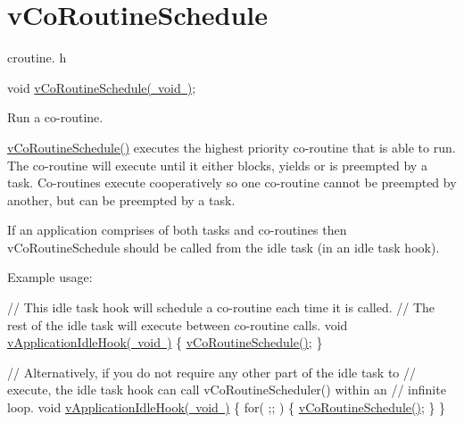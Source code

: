 \hypertarget{group__v_co_routine_schedule}{}\section{v\+Co\+Routine\+Schedule}
\label{group__v_co_routine_schedule}
croutine. h 
\begin{DoxyPre}
void \mbox{\hyperlink{croutine_8h_a5333c649a2c063006ca3cd7a3b5b9240}{vCoRoutineSchedule( void )}};\end{DoxyPre}


Run a co-\/routine.

\mbox{\hyperlink{croutine_8h_a5333c649a2c063006ca3cd7a3b5b9240}{v\+Co\+Routine\+Schedule()}} executes the highest priority co-\/routine that is able to run. The co-\/routine will execute until it either blocks, yields or is preempted by a task. Co-\/routines execute cooperatively so one co-\/routine cannot be preempted by another, but can be preempted by a task.

If an application comprises of both tasks and co-\/routines then v\+Co\+Routine\+Schedule should be called from the idle task (in an idle task hook).

Example usage\+: 
\begin{DoxyPre}
// This idle task hook will schedule a co-routine each time it is called.
// The rest of the idle task will execute between co-routine calls.
void \mbox{\hyperlink{_free_r_t_o_s_common_hooks_8h_a97fd430f36f8b065226e2bff9bad1de5}{vApplicationIdleHook( void )}}
\{
   \mbox{\hyperlink{croutine_8h_a5333c649a2c063006ca3cd7a3b5b9240}{vCoRoutineSchedule()}};
\}\end{DoxyPre}



\begin{DoxyPre}// Alternatively, if you do not require any other part of the idle task to
// execute, the idle task hook can call vCoRoutineScheduler() within an
// infinite loop.
void \mbox{\hyperlink{_free_r_t_o_s_common_hooks_8h_a97fd430f36f8b065226e2bff9bad1de5}{vApplicationIdleHook( void )}}
\{
   for( ;; )
   \{
       \mbox{\hyperlink{croutine_8h_a5333c649a2c063006ca3cd7a3b5b9240}{vCoRoutineSchedule()}};
   \}
\}
\end{DoxyPre}
 